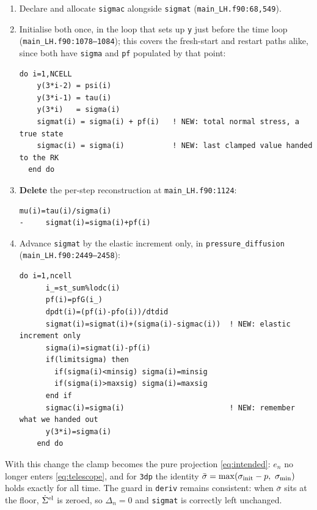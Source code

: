 \documentclass[11pt]{article}
\newcommand{\code}[1]{\texttt{#1}}
\newcommand{\sigeff}{\bar{\sigma}}
\newcommand{\sigtot}{\Sigma}
\begin{document}
\begin{enumerate}
\item Declare and allocate \code{sigmac} alongside \code{sigmat}
      (\code{main\_LH.f90:68,549}).

\item Initialise both once, in the loop that sets up \code{y} just before the
      time loop (\code{main\_LH.f90:1078--1084}); this covers the fresh-start
      and restart paths alike, since both have \code{sigma} and \code{pf}
      populated by that point:
\begin{lstlisting}[style=f90]
  do i=1,NCELL
    y(3*i-2) = psi(i)
    y(3*i-1) = tau(i)
    y(3*i)   = sigma(i)
    sigmat(i) = sigma(i) + pf(i)   ! NEW: total normal stress, a true state
    sigmac(i) = sigma(i)           ! NEW: last clamped value handed to the RK
  end do
\end{lstlisting}

\item \textbf{Delete} the per-step reconstruction at
      \code{main\_LH.f90:1124}:
\begin{lstlisting}[style=f90]
      mu(i)=tau(i)/sigma(i)
-     sigmat(i)=sigma(i)+pf(i)
\end{lstlisting}

\item Advance \code{sigmat} by the elastic increment only, in
      \code{pressure\_diffusion} (\code{main\_LH.f90:2449--2458}):
\begin{lstlisting}[style=f90]
    do i=1,ncell
      i_=st_sum%lodc(i)
      pf(i)=pfG(i_)
      dpdt(i)=(pf(i)-pfo(i))/dtdid
      sigmat(i)=sigmat(i)+(sigma(i)-sigmac(i))  ! NEW: elastic increment only
      sigma(i)=sigmat(i)-pf(i)
      if(limitsigma) then
        if(sigma(i)<minsig) sigma(i)=minsig
        if(sigma(i)>maxsig) sigma(i)=maxsig
      end if
      sigmac(i)=sigma(i)                        ! NEW: remember what we handed out
      y(3*i)=sigma(i)
    end do
\end{lstlisting}
\end{enumerate}

With this change the clamp becomes the pure projection \eqref{eq:intended}:
$e_n$ no longer enters \eqref{eq:telescope}, and for \code{3dp} the identity
$\sigeff = \max(\sigma_{\rm init}-p,\ \sigma_{\min})$ holds exactly for all
time. The guard in \code{deriv} remains consistent: when $\sigeff$ sits at the
floor, $\dot\sigtot^{\rm el}$ is zeroed, so $\Delta_n=0$ and \code{sigmat} is
correctly left unchanged.
\end{document}
